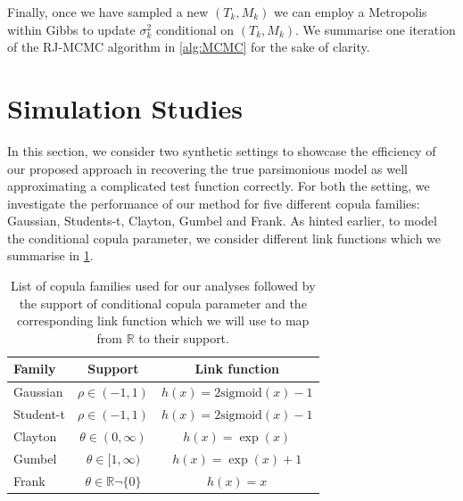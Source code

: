 \documentclass{amsart}
\begin{document}
Finally, once we have sampled a new $(T_k,M_k)$ we can employ a Metropolis within Gibbs to update $\sigma_{k}^2$ conditional on $(T_k,M_k)$. We summarise one iteration of the RJ-MCMC algorithm in \cref{alg:MCMC} for the sake of clarity.


\section{Simulation Studies}\label{sec:sim}

In this section, we consider two synthetic settings to showcase the efficiency of our proposed approach in recovering the true parsimonious model as well approximating a complicated test function correctly. For both the setting, we investigate the performance of our method for five different copula families: Gaussian, Students-t, Clayton, Gumbel and Frank. As hinted earlier, to model the conditional copula parameter, we consider different link functions which we summarise in \cref{tab:cop:link}.

\begin{table}[H]
	\centering
	\begin{tabular}{l|c|c}
		Family & Support & Link function\\
		\midrule
		Gaussian & $\rho \in (-1,1)$ & $h(x)=2\text{sigmoid}(x) -1$\\
		Student-t & $\rho \in (-1,1)$ & $h(x)=2\text{sigmoid}(x) -1$\\
		Clayton & $\theta \in (0,\infty)$ & $h(x)=\exp(x)$\\
		Gumbel & $\theta\in [1,\infty)$ & $h(x)=\exp(x)+1$\\
		Frank & $\theta\in \mathbb{R}\neg \{0\}$ & $h(x)=x$\\
		\end{tabular}
	\caption{List of copula families used for our analyses followed by the support of conditional copula parameter and the corresponding link function which we will use to map from $\mathbb{R}$ to their support.}
	\label{tab:cop:link}
\end{table}
\end{document}
